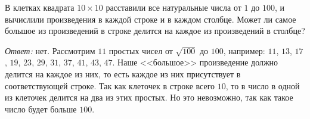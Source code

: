 \problem
В клетках квадрата $10 \times 10$ расставили все натуральные числа от $1$ до
$100$, и вычислили произведения в каждой строке и в каждом столбце.
Может ли самое большое из произведений в строке делится на каждое из
произведений в столбце?

\solution
\emph{Ответ:} нет.
Рассмотрим $11$ простых чисел от $\sqrt{100}$ до $100$, например:
$11$, $13$, $17$, $19$, $23$, $29$, $31$, $37$, $41$, $43$, $47$.
Наше <<большое>> произведение должно делится на каждое из них, то есть каждое из
них присутствует в соответствующей строке.
Так как клеточек в строке всего $10$, то в число в одной из клеточек делится на
два из этих простых.
Но это невозможно, так как такое число будет больше $100$.

\endproblem
